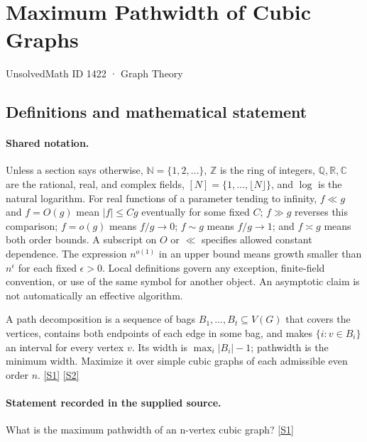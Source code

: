 \documentclass[11pt,a4paper]{article}
\newcommand{\N}{\mathbb{N}}
\newcommand{\Z}{\mathbb{Z}}
\newcommand{\Q}{\mathbb{Q}}
\newcommand{\R}{\mathbb{R}}
\newcommand{\C}{\mathbb{C}}
\newcommand{\sref}[2]{\hyperlink{source:#1:#2}{[S#2]}}
\begin{document}

\setcounter{section}{1421}

\section{Maximum Pathwidth of Cubic Graphs}\label{1422}

{\small\sffamily UnsolvedMath ID 1422 · Graph Theory}

\subsection{Definitions and mathematical statement}

\paragraph{Shared notation.}Unless a section says otherwise, $\N=\{1,2,\ldots\}$,
$\Z$ is the ring of integers, $\Q,\R,\C$ are the rational, real, and complex
fields, $[N]=\{1,\ldots,\lfloor N\rfloor\}$, and $\log$ is the natural
logarithm. For real functions of a parameter tending to infinity,
$f\ll g$ and $f=O(g)$ mean $|f|\leq Cg$ eventually for some fixed $C$;
$f\gg g$ reverses this comparison; $f=o(g)$ means $f/g\to0$;
$f\sim g$ means $f/g\to1$; and $f\asymp g$ means both order bounds.
A subscript on $O$ or $\ll$ specifies allowed constant dependence.
The expression $n^{o(1)}$ in an upper bound means growth smaller than
$n^\epsilon$ for each fixed $\epsilon>0$. Local definitions govern any
exception, finite-field convention, or use of the same symbol for another
object. An asymptotic claim is not automatically an effective algorithm.



A path decomposition is a sequence of bags $B_1,\ldots,B_t\subseteq V(G)$ that covers the vertices, contains both endpoints of each edge in some bag, and makes $\{i:v\in B_i\}$ an interval for every vertex $v$. Its width is $\max_i|B_i|-1$; pathwidth is the minimum width. Maximize it over simple cubic graphs of each admissible even order $n$. \sref{1422}{1} \sref{1422}{2}

\paragraph{Statement recorded in the supplied source.}
What is the maximum pathwidth of an n-vertex cubic graph? \sref{1422}{1}
\end{document}
